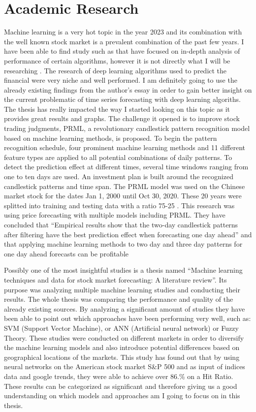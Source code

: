 \documentclass{imc-inf}
\begin{document}
	\section{Academic Research}
		Machine learning is a very hot topic in the year 2023 and its combination with the well known stock market is a prevalent combination
		of the past few years. I have been able to find study such as\cite{ref1}  that have focused on in-depth analysis of performance of certain algorithms,
		however it is not directly what I will be researching . The research of deep learning algorithms used to predict the financial \cite{deep_learning}
		were very niche and well performed. I am definitely going to use the already existing findings from the author's essay in order to gain better insight
		on the current problematic of time series forecasting with deep  learning algoriths. 
		The thesis \cite{prml} has really impacted the way I started looking on this topic as it provides great results and graphs.
		The challenge it opened is to improve stock trading judgments, PRML, a revolutionary candlestick pattern recognition model based on machine learning
		methods, is proposed. To begin the pattern recognition schedule, four prominent machine learning methods and 11 different feature types are applied 
		to all potential combinations of daily patterns. To detect the prediction effect at different times, several time windows ranging from one to ten days
		are used. An investment plan is built around the recognized candlestick patterns and time span.
		The PRML model was used on the Chinese market stock for the dates  Jan 1, 2000 until Oct 30, 2020. These 20 years were splitted into training
		and testing data with a ratio 75-25 . This research was using price forecasting with multiple models including PRML. They have concluded that 
		“Empirical results show that the two-day candlestick patterns after filtering have the best prediction effect when forecasting one day ahead”
		and that applying machine learning methods to two day and three day  patterns for one day ahead forecasts can be profitable

		Possibly one of the most insightful studies is a thesis named “Machine learning techniques and data for stock market forecasting: A literature review”.\cite{lit_review} 
		Its purpose was analyzing multiple machine learning studies and conducting their results. The whole thesis was comparing the performance and quality 
		of the already existing sources. By analyzing a significant amount of studies they have been able to point out which approaches have been performing
		very well, such as: SVM (Support Vector Machine), or  ANN (Artificial neural network) or Fuzzy Theory. These studies were conducted on different markets
		in order to diversify the machine learning models and also introduce potential differences based on geographical locations of the markets.
		This study has found out that by using neural networks on the American stock market  S\&P 500  and as input of indices data and google trends,
		they were able to achieve over 86.\% on a Hit Ratio. These results can be categorized as significant and therefore giving us a good understanding 
		on which models and approaches am I going to focus on in this thesis.
\end{document}
